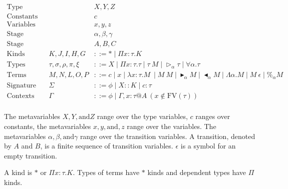\documentclass[runningheads]{llncs}
\newcommand{\TW}{\triangleright}
\newcommand{\F}{\forall}
\newcommand{\TB}{\blacktriangleright}
\newcommand{\TBL}{\blacktriangleleft}
\begin{document}
\begin{align*}
	\textrm{Type variables}  &  &                          & X,Y,Z                                                                             \\
	\textrm{Constants}       &  &                          & c                                                                                 \\
	\textrm{Variables}       &  &                          & x,y,z                                                                             \\
	\textrm{Stage variables} &  &                          & \alpha,\beta,\gamma                                                               \\
	\textrm{Stage}           &  &                          & A,B,C                                                                             \\
	\textrm{Kinds}           &  & K,J,I,H,G                & ::= * \mid \Pi x:\tau.K                                                           \\
	\textrm{Types}           &  & \tau,\sigma,\rho,\pi,\xi & ::= X \mid \Pi x:\tau.\tau \mid \tau\ M \mid \TW_{\alpha} \tau \mid \F\alpha.\tau \\
	\textrm{Terms}           &  & M,N,L,O,P                & ::= c \mid x \mid \lambda x:\tau.M\ \mid M\ M \mid \TB_\alpha M 
	\mid \TBL_\alpha M \mid \Lambda\alpha.M \mid M\ \epsilon \mid \%_\alpha M                                                                  \\ 
	\textrm{Signature}       &  & \Sigma                   & ::= \phi \mid X::K \mid c:\tau                                                    \\
	\textrm{Contexts}        &  & \Gamma                   & ::= \phi \mid  \Gamma,x:\tau @A\ (x\not\in\textrm{FV}(\tau))                         \\
\end{align*}

The metavariables $X, Y, \text{and} Z$ range over the type variables, $c$ ranges over constants, the metavariables $x, y, \text{and}, z$ range over the variables.
The metavariables $\alpha, \beta, \text{and} \gamma$ range over the transition variables.
A transition, denoted by $A$ and $B$, is a finite sequence of transition variables.
$\epsilon$ is a symbol for an empty transition.

A kind is $*$ or $\Pi x:\tau.K$. Types of terms have $*$ kinds and dependent types have $\Pi$ kinds.
\end{document}
